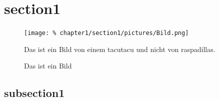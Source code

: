 \section{section1}\label{sec:section1}
	\lipsum[2]
	
	\newpage
		
	\begin{figure}[h]
		\centering
		\texttt{[image: \%
			chapter1/section1/pictures/Bild.png]}
		\caption[Bild]{Das ist ein Bild von einem \Gls{tacutacu} %
		               und nicht von \Glspl{raspadilla}.}
		\label{pic:Bild}
	\end{figure} %
	
	\begin{figure}[h]
		\centering
		\scalebox{0.8}{}
		\caption[Plot]{Das ist ein Bild}
		\label{pic:Plot}
	\end{figure}
	
	\subsection{subsection1}
		\lipsum[3]
		
